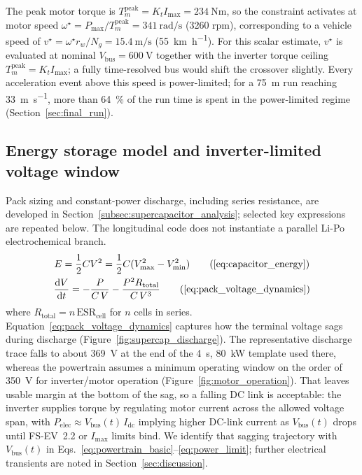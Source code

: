 The peak motor torque is $T_m^\text{peak} = K_t I_\text{max} =
\SI{234}{\newton\metre}$, so the constraint activates at motor speed
$\omega^\star = P_\text{max}/T_m^\text{peak} = \SI{341}{\radian\per\second}$
(\num{3260} rpm), corresponding to a vehicle speed of
$v^\star = \omega^\star r_w / N_g = \SI{15.4}{\metre\per\second}$
(\SI{55}{\kilo\metre\per\hour}).
For this scalar estimate, $v^\star$ is evaluated at nominal $V_{\mathrm{bus}}=\SI{600}{\volt}$ together with the inverter torque ceiling $T_m^{\mathrm{peak}}=K_t I_{\max}$; a fully time-resolved bus would shift the crossover slightly.
Every acceleration event above this
speed is power-limited; for a \SI{75}{\metre} run reaching
\SI{33}{\metre\per\second}, more than \SI{64}{\percent} of the run
time is spent in the power-limited regime
(Section~\ref{sec:final_run}).

\subsection{Energy storage model and inverter-limited voltage window}
\label{sec:accum_storage_model}

Pack sizing and constant-power discharge, including series resistance, are developed in Section~\ref{subsec:supercapacitor_analysis}; selected key expressions are repeated below.
The longitudinal code does not instantiate a parallel Li-Po electrochemical branch.
\begin{gather}
E=\frac{1}{2}CV^2=\frac{1}{2}C(V_{\max}^2-V_{\min}^2)
\tag{\ref{eq:capacitor_energy}}\\
\frac{\mathrm{d}V}{\mathrm{d}t}
=-\frac{P}{C\,V}-\frac{P^2 R_{\mathrm{total}}}{C\,V^{3}}
\tag{\ref{eq:pack_voltage_dynamics}}
\end{gather}
where $R_{\mathrm{total}}=n\,\mathrm{ESR}_{\mathrm{cell}}$ for $n$ cells in series.
Equation~\eqref{eq:pack_voltage_dynamics} captures how the terminal voltage sags during discharge (Figure~\ref{fig:supercap_discharge}).
The representative discharge trace falls to about \SI{369}{\volt} at the end of the \SI{4}{\second}, \SI{80}{\kilo\watt} template used there, whereas the powertrain assumes a minimum operating window on the order of \SI{350}{\volt} for inverter/motor operation (Figure~\ref{fig:motor_operation}).
That leaves usable margin at the bottom of the sag, so a falling DC link is acceptable: the inverter supplies torque by regulating motor current across the allowed voltage span, with $P_{\mathrm{elec}}\approx V_{\mathrm{bus}}(t)\,I_{\mathrm{dc}}$ implying higher DC-link current as $V_{\mathrm{bus}}(t)$ drops until FS-EV~2.2 or $I_\text{max}$ limits bind.
We identify that sagging trajectory with $V_{\mathrm{bus}}(t)$ in Eqs.~\ref{eq:powertrain_basic}--\ref{eq:power_limit}; further electrical transients are noted in Section~\ref{sec:discussion}.

